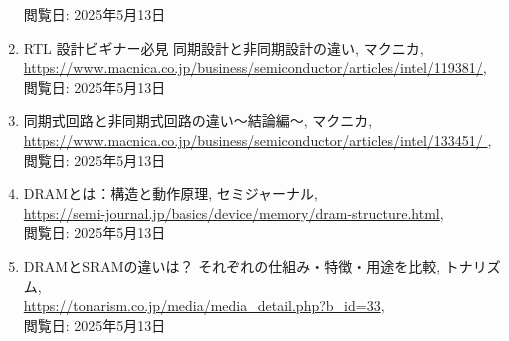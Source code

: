 \documentclass{jlreq}
\numberwithin{equation}{section}
\begin{document}
\begin{enumerate}
閲覧日: 2025年5月13日\
\item RTL 設計ビギナー必見 同期設計と非同期設計の違い, マクニカ, \\
\url{https://www.macnica.co.jp/business/semiconductor/articles/intel/119381/}, \\
閲覧日: 2025年5月13日
\item 同期式回路と非同期式回路の違い～結論編～, マクニカ, \\
\url{https://www.macnica.co.jp/business/semiconductor/articles/intel/133451/ }, \\
閲覧日: 2025年5月13日
\item DRAMとは：構造と動作原理, セミジャーナル, \\
\url{https://semi-journal.jp/basics/device/memory/dram-structure.html}, \\
閲覧日: 2025年5月13日
\item DRAMとSRAMの違いは？ それぞれの仕組み・特徴・用途を比較, トナリズム, \\
\url{https://tonarism.co.jp/media/media_detail.php?b_id=33}, \\
閲覧日: 2025年5月13日
\end{enumerate}
\end{document}
